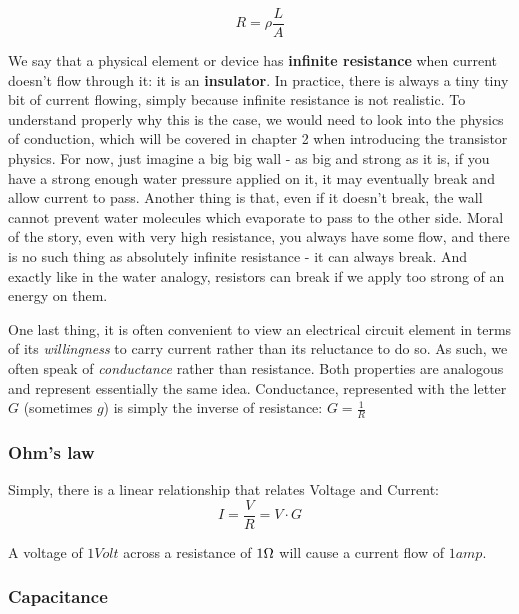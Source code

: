 \begin{equation}
    R = \rho \frac{L}{A}
\end{equation}

We say that a physical element or device has \textbf{infinite resistance} when current doesn't flow through it: it is an \textbf{insulator}. In practice, there is always a tiny tiny bit of current flowing, simply because infinite resistance is not realistic. To understand properly why this is the case, we would need to look into the physics of conduction, which will be covered in chapter 2 when introducing the transistor physics. For now, just imagine a big big wall - as big and strong as it is, if you have a strong enough water pressure applied on it, it may eventually break and allow current to pass. Another thing is that, even if it doesn't break, the wall cannot prevent water molecules which evaporate to pass to the other side. Moral of the story, even with very high resistance, you always have some flow, and there is no such thing as absolutely infinite resistance - it can always break. And exactly like in the water analogy, resistors can break if we apply too strong of an energy on them. 

One last thing, it is often convenient to view an electrical circuit element in terms of its \textit{willingness} to carry current rather than its reluctance to do so. As such, we often speak of \textit{conductance} rather than resistance. Both properties are analogous and represent essentially the same idea. Conductance, represented with the letter $G$ (sometimes $g$) is simply the inverse of resistance: $G = \frac{1}{R}$

\subsubsection{Ohm's law}

Simply, there is a linear relationship that relates Voltage and Current: 
\begin{equation}
    I = \frac{V}{R} = V\cdot G
\end{equation}

A voltage of $1 Volt$ across a resistance of $1 \ohm$ will cause a current flow of $1 amp$.

\subsubsection{Capacitance}

